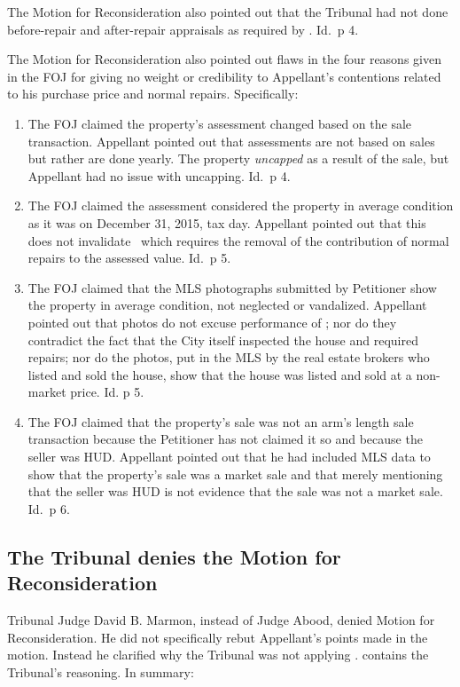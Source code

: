 \documentclass[12pt,\documentclassflag]{michiganCourtOfAppealsBrief}
\begin{document}
The Motion for Reconsideration also pointed out that the Tribunal had not done before-repair and after-repair appraisals as required by \mathieuGast. Id.\ p 4.

The Motion for Reconsideration also pointed out flaws in the four reasons given in the FOJ for giving no weight or credibility to Appellant's contentions related to his purchase price and normal repairs. Specifically:

\begin{enumerate}
\item The FOJ claimed the property's assessment changed based on the sale transaction. Appellant pointed out that assessments are not based on sales but rather are done yearly. The property \emph{uncapped} as a result of the sale, but Appellant had no issue with uncapping. Id.\ p 4.

\item The FOJ claimed the assessment considered the property in average condition as it was on December 31, 2015, tax day. Appellant pointed out that this does not invalidate \mathieuGast\ which requires the removal of the contribution of normal repairs to the assessed value. Id.\ p 5. 

\item The FOJ claimed that the MLS photographs submitted by Petitioner show the property in average condition, not neglected or vandalized. Appellant pointed out that photos do not excuse performance of \mathieuGast; nor do they contradict the fact that the City itself inspected the house and required repairs; nor do the photos, put in the MLS by the real estate brokers who listed and sold the house, show that the house was listed and sold at a non-market price. Id. p 5.
  
\item The FOJ claimed that the property's sale was not an arm's length sale transaction because the Petitioner has not claimed it so and because the seller was HUD. Appellant pointed out that he had included MLS data to show that the property's sale was a market sale and that merely mentioning that the seller was HUD is not evidence that the sale was not a market sale. Id.\ p 6.
\end{enumerate}

\subsection{The Tribunal denies the Motion for Reconsideration}

Tribunal Judge David B. Marmon, instead of Judge Abood, denied Motion for Reconsideration. He did not specifically rebut Appellant's points made in the motion. Instead he clarified why the Tribunal was not applying \mathieuGast. \reconsiderationDenied[2] contains the Tribunal's reasoning. In summary:
\end{document}
